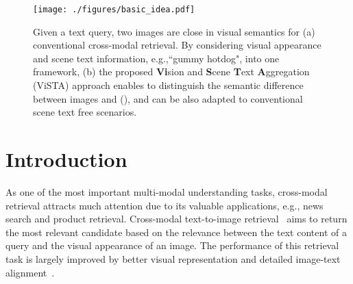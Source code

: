 \documentclass[10pt,twocolumn,letterpaper]{article}
\begin{document}
\begin{figure}[ht]
   \texttt{[image: ./figures/basic\_idea.pdf]}\vspace{-1em}
   \caption{Given a text query, two images are close in visual semantics for (a) conventional cross-modal retrieval. By considering visual appearance and scene text information, e.g.,``gummy hotdog", into one framework, (b) the proposed \textbf{Vi}sion and \textbf{S}cene \textbf{T}ext \textbf{A}ggregation (ViSTA) approach enables to distinguish the semantic difference between images  and  (), and can be also adapted to conventional scene text free scenarios.}\vspace{-1.25em}
   \label{fig:motivation}
\end{figure}

\vspace{-1em}
\section{Introduction}\label{sec:intro}
As one of the most important multi-modal understanding tasks, cross-modal retrieval attracts much attention due to its valuable applications, e.g., news search and product retrieval. Cross-modal text-to-image retrieval~\cite{frome2013devise,faghri2017vse++,SCAN} aims to return the most relevant candidate based on the relevance between the text content of a query and the visual appearance of an image. The performance of this retrieval task is largely improved by better 
visual representation and detailed image-text alignment~\cite{SCAN, VSRN, GSMN, IMRAM}. 
\end{document}
